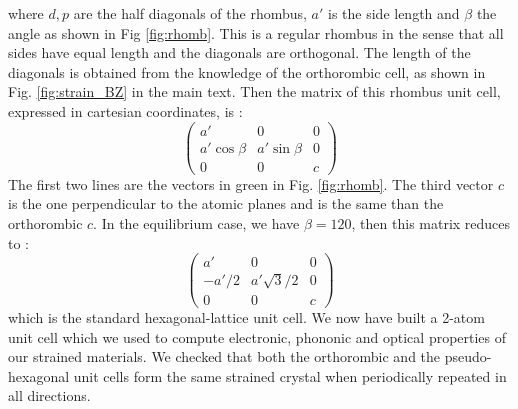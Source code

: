 where $d,p$ are the half diagonals of the rhombus, $a'$ is the side length and $\beta$ the angle as shown in Fig \ref{fig:rhomb}. This is a regular rhombus in the sense that all sides have equal length and the diagonals are orthogonal. The length of the diagonals is obtained from the knowledge of the orthorombic cell, as shown in Fig. \ref{fig:strain_BZ} in the main text.
Then the matrix of this rhombus unit cell, expressed in cartesian coordinates, is :
\begin{equation}
\begin{pmatrix}
a' & 0 & 0\\
a'\cos\beta & a'\sin\beta & 0\\
0 & 0 & c
\end{pmatrix}
\end{equation}
The first two lines are the vectors in green in Fig. \ref{fig:rhomb}. The third vector $c$ is the one perpendicular to the atomic planes and is the same than the orthorombic $c$.
In the equilibrium case, we have $\beta = 120$\textdegree, then this matrix reduces to :
\begin{equation}
\begin{pmatrix}
a' & 0 & 0\\
-a'/2 & a'\sqrt{3}/2 & 0\\
0 & 0 & c
\end{pmatrix}
\end{equation}
which is the standard hexagonal-lattice unit cell. We now have built a 2-atom unit cell which we used to compute electronic, phononic and optical properties of our strained materials. We checked that both the orthorombic and the pseudo-hexagonal unit cells form the same strained crystal when periodically repeated in all directions.